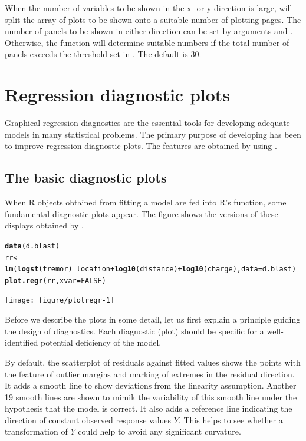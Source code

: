 \documentclass[11pt]{article}\usepackage[]{graphicx}\usepackage[]{color}
\makeatletter
\newcommand{\hlnum}[1]{\textcolor[rgb]{0.686,0.059,0.569}{#1}}%
\newcommand{\hlopt}[1]{\textcolor[rgb]{0,0,0}{#1}}%
\newcommand{\hlstd}[1]{\textcolor[rgb]{0.345,0.345,0.345}{#1}}%
\newcommand{\hlkwb}[1]{\textcolor[rgb]{0.69,0.353,0.396}{#1}}%
\newcommand{\hlkwc}[1]{\textcolor[rgb]{0.333,0.667,0.333}{#1}}%
\newcommand{\hlkwd}[1]{\textcolor[rgb]{0.737,0.353,0.396}{\textbf{#1}}}%
\newenvironment{kframe}{%
 \def\at@end@of@kframe{}%
 \ifinner\ifhmode%
  \def\at@end@of@kframe{\end{minipage}}%
  \begin{minipage}{\columnwidth}%
 \fi\fi%
 \def\FrameCommand##1{\hskip\@totalleftmargin \hskip-\fboxsep
 \colorbox{shadecolor}{##1}\hskip-\fboxsep
     \hskip-\linewidth \hskip-\@totalleftmargin \hskip\columnwidth}%
 \MakeFramed {\advance\hsize-\width
   \@totalleftmargin\z@ \linewidth\hsize
   \@setminipage}}%
 {\par\unskip\endMakeFramed%
 \at@end@of@kframe}
\newenvironment{knitrout}{}{} %
\makeatother
\begin{document}
When the number of variables to be shown in the x- or y-direction is large,
 will split the array of plots to be shown onto a suitable
number of plotting pages. The number of panels to be shown in either
direction can be set by arguments  and . Otherwise, the
function will determine suitable numbers if the total number of panels
exceeds the threshold set in . The default is 30.


\section{Regression diagnostic plots}
Graphical regression diagnostics are the essential tools for developing
adequate models in many statistical problems.
The primary purpose of developing  has been to improve
regression diagnostic plots.
The features are obtained by using .

\subsection{The basic diagnostic plots}
When R objects obtained from fitting a model are fed into R's 
function, some fundamental diagnostic plots appear. 
The figure shows the versions of these displays obtained by .

\begin{knitrout}
\color{fgcolor}\begin{kframe}
\begin{alltt}
\hlkwd{data}\hlstd{(d.blast)}
\hlstd{rr} \hlkwb{<-}
  \hlkwd{lm}\hlstd{(}\hlkwd{logst}\hlstd{(tremor)}\hlopt{~}\hlstd{location}\hlopt{+}\hlkwd{log10}\hlstd{(distance)}\hlopt{+}\hlkwd{log10}\hlstd{(charge),} \hlkwc{data}\hlstd{=d.blast)}
\hlkwd{plot.regr}\hlstd{(rr,} \hlkwc{xvar}\hlstd{=}\hlnum{FALSE}\hlstd{)}
\end{alltt}


{\ttfamily\noindent\color{warningcolor}{\#\# Warning in sqrt((1 - llx) * ldfres/llx): NaNs produced}}\end{kframe}
\texttt{[image: figure/plotregr-1]} 

\end{knitrout}
Before we describe the plots in some detail, let us first explain a 
principle guiding the design of diagnostics.
Each diagnostic (plot) should be specific for a well-identified potential 
deficiency of the model.

By default, the scatterplot of residuals against fitted values shows
the points with the feature of outlier margins and marking of extremes in
the residual direction. It adds a smooth line to show deviations from
the linearity assumption. Another 19 smooth lines are shown to 
mimik the variability of this smooth line under the hypothesis that the
model is correct.
It also adds a reference line indicating the direction of constant observed
response values $Y$. This helps to see whether a transformation of $Y$
could help to avoid any significant curvature.
\end{document}
